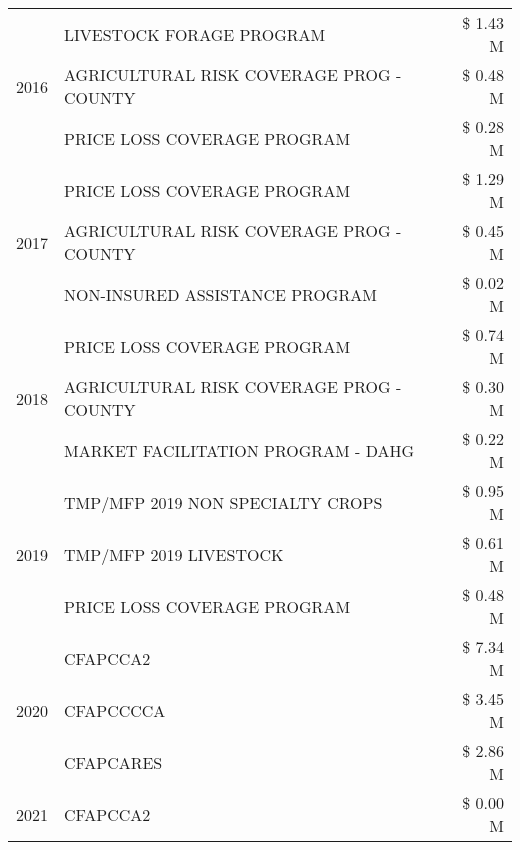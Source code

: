 \begin{tabular}{llr}
\cline{1-3}
\multirow[t]{3}{*}{2016} & LIVESTOCK FORAGE PROGRAM                      & \$ 1.43 M \\
 & AGRICULTURAL RISK COVERAGE PROG - COUNTY      & \$ 0.48 M \\
 & PRICE LOSS COVERAGE PROGRAM                   & \$ 0.28 M \\
\cline{1-3}
\multirow[t]{3}{*}{2017} & PRICE LOSS COVERAGE PROGRAM & \$ 1.29 M \\
 & AGRICULTURAL RISK COVERAGE PROG - COUNTY & \$ 0.45 M \\
 & NON-INSURED ASSISTANCE PROGRAM & \$ 0.02 M \\
\cline{1-3}
\multirow[t]{3}{*}{2018} & PRICE LOSS COVERAGE PROGRAM & \$ 0.74 M \\
 & AGRICULTURAL RISK COVERAGE PROG - COUNTY & \$ 0.30 M \\
 & MARKET FACILITATION PROGRAM - DAHG & \$ 0.22 M \\
\cline{1-3}
\multirow[t]{3}{*}{2019} & TMP/MFP 2019 NON SPECIALTY CROPS & \$ 0.95 M \\
 & TMP/MFP 2019 LIVESTOCK & \$ 0.61 M \\
 & PRICE LOSS COVERAGE PROGRAM & \$ 0.48 M \\
\cline{1-3}
\multirow[t]{3}{*}{2020} & CFAPCCA2 & \$ 7.34 M \\
 & CFAPCCCCA & \$ 3.45 M \\
 & CFAPCARES & \$ 2.86 M \\
\cline{1-3}
2021 & CFAPCCA2 & \$ 0.00 M \\
\cline{1-3}
\bottomrule
\end{tabular}
